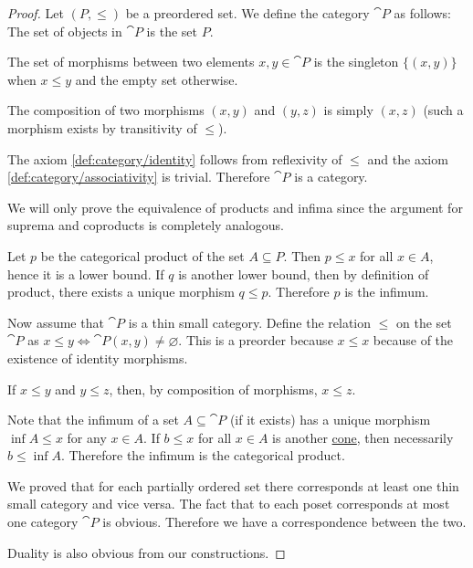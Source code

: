 \begin{proof}
  \SufficiencySubProof Let \( (P, \leq) \) be a preordered set. We define the category \( \cat{P} \) as follows:
   The set of objects in \( \cat{P} \) is the set \( P \).

   The set of morphisms between two elements \( x, y \in \cat{P} \) is the singleton \( \{ (x, y) \} \) when \( x \leq y \) and the empty set otherwise.

   The composition of two morphisms \( (x, y) \) and \( (y, z) \) is simply \( (x, z) \) (such a morphism exists by transitivity of \( \leq \)).

  The axiom \ref{def:category/identity} follows from reflexivity of \( \leq \) and the axiom \ref{def:category/associativity} is trivial. Therefore \( \cat{P} \) is a category.

  We will only prove the equivalence of products and infima since the argument for suprema and coproducts is completely analogous.

  Let \( p \) be the categorical product of the set \( A \subseteq P \). Then \( p \leq x \) for all \( x \in A \), hence it is a lower bound. If \( q \) is another lower bound, then by definition of product, there exists a unique morphism \( q \leq p \). Therefore \( p \) is the infimum.

  \NecessitySubProof Now assume that \( \cat{P} \) is a thin small category. Define the relation \( \leq \) on the set \( \cat{P} \) as \( x \leq y \iff \cat{P}(x, y) \neq \varnothing \). This is a preorder because
   \( x \leq x \) because of the existence of identity morphisms.

   If \( x \leq y \) and \( y \leq z \), then, by composition of morphisms, \( x \leq z \).

  Note that the infimum of a set \( A \subseteq \cat{P} \) (if it exists) has a unique morphism \( \inf A \leq x \) for any \( x \in A \). If \( b \leq x \) for all \( x \in A \) is another \hyperref[def:categorical_cone]{cone}, then necessarily \( b \leq \inf A \). Therefore the infimum is the categorical product.

  We proved that for each partially ordered set there corresponds at least one thin small category and vice versa. The fact that to each poset corresponds at most one category \( \cat{P} \) is obvious. Therefore we have a correspondence between the two.

  Duality is also obvious from our constructions.
\end{proof}

